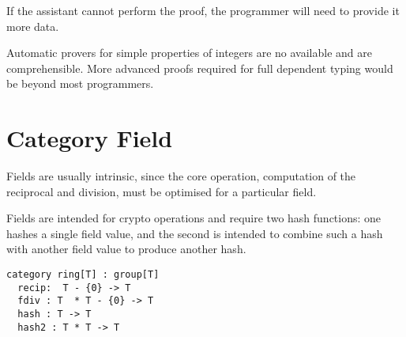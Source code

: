 \documentclass[oneside]{book}
\theoremstyle{plain}
\theoremstyle{definition}
\theoremstyle{plain}
\begin{document}
If the assistant cannot perform the proof, the programmer will
need to provide it more data.

Automatic provers for simple properties of integers are no available
and are comprehensible. More advanced proofs required for full
dependent typing would be beyond most programmers.


\section{Category Field}
Fields are usually intrinsic, since the core operation, computation
of the reciprocal and division, must be optimised for a particular
field.

Fields are intended for crypto operations and require two hash functions:
one hashes a single field value, and the second is intended to combine 
such a hash with another field value to produce another hash.

\begin{verbatim}
category ring[T] : group[T]
  recip:  T - {0} -> T
  fdiv : T  * T - {0} -> T
  hash : T -> T
  hash2 : T * T -> T
\end{verbatim}

\printbibliography
\end{document}
